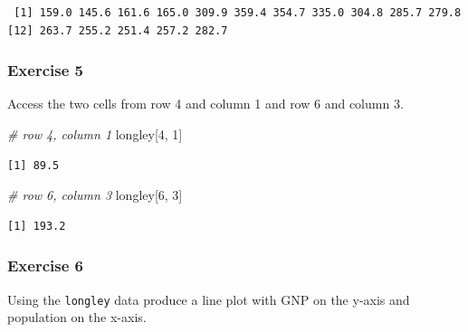 \documentclass[]{article}
\newenvironment{Shaded}{\begin{snugshade}}{\end{snugshade}}
\newcommand{\KeywordTok}[1]{\textcolor[rgb]{0.13,0.29,0.53}{\textbf{#1}}}
\newcommand{\DataTypeTok}[1]{\textcolor[rgb]{0.13,0.29,0.53}{#1}}
\newcommand{\DecValTok}[1]{\textcolor[rgb]{0.00,0.00,0.81}{#1}}
\newcommand{\StringTok}[1]{\textcolor[rgb]{0.31,0.60,0.02}{#1}}
\newcommand{\CommentTok}[1]{\textcolor[rgb]{0.56,0.35,0.01}{\textit{#1}}}
\newcommand{\OperatorTok}[1]{\textcolor[rgb]{0.81,0.36,0.00}{\textbf{#1}}}
\newcommand{\NormalTok}[1]{#1}
\theoremstyle{definition}
\theoremstyle{definition}
\theoremstyle{definition}
\theoremstyle{remark}
\begin{document}
\begin{verbatim}
 [1] 159.0 145.6 161.6 165.0 309.9 359.4 354.7 335.0 304.8 285.7 279.8
[12] 263.7 255.2 251.4 257.2 282.7
\end{verbatim}

\subsubsection{Exercise 5}\label{exercise-5-1}

Access the two cells from row 4 and column 1 and row 6 and column 3.

\begin{Shaded}
\begin{Highlighting}[]
\CommentTok{# row 4, column 1}
\NormalTok{longley[}\DecValTok{4}\NormalTok{, }\DecValTok{1}\NormalTok{]}
\end{Highlighting}
\end{Shaded}

\begin{verbatim}
[1] 89.5
\end{verbatim}

\begin{Shaded}
\begin{Highlighting}[]
\CommentTok{# row 6, column 3}
\NormalTok{longley[}\DecValTok{6}\NormalTok{, }\DecValTok{3}\NormalTok{]}
\end{Highlighting}
\end{Shaded}

\begin{verbatim}
[1] 193.2
\end{verbatim}

\subsubsection{Exercise 6}\label{exercise-6-1}

Using the \texttt{longley} data produce a line plot with GNP on the
y-axis and population on the x-axis.

\begin{Shaded}
\end{Shaded}
\end{document}
